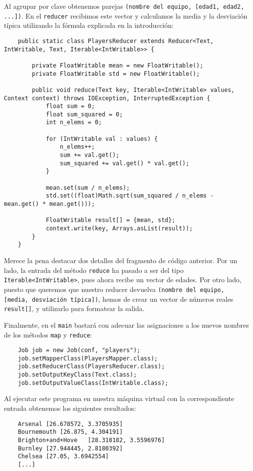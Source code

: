 \documentclass[11pt]{article}
\def\inline{\lstinline[basicstyle=\ttfamily,keywordstyle={}]}
\begin{document}
Al agrupar por clave obtenemos parejas \inline{(nombre del equipo, [edad1, edad2, ...])}. En el \inline{reducer} recibimos este vector y calculamos la media y la desviación típica utilizando la fórmula explicada en la introducción:

\begin{verbatim}
	public static class PlayersReducer extends Reducer<Text, IntWritable, Text, Iterable<IntWritable>> {
		
		private FloatWritable mean = new FloatWritable();
		private FloatWritable std = new FloatWritable();
		
		public void reduce(Text key, Iterable<IntWritable> values, Context context) throws IOException, InterruptedException {
			float sum = 0;
			float sum_squared = 0;
			int n_elems = 0;
			
			for (IntWritable val : values) {
				n_elems++;
				sum += val.get();
				sum_squared += val.get() * val.get();
			}
			
			mean.set(sum / n_elems);
			std.set((float)Math.sqrt(sum_squared / n_elems - mean.get() * mean.get()));
			
			FloatWritable result[] = {mean, std};
			context.write(key, Arrays.asList(result));
		}
	}
\end{verbatim}

Merece la pena destacar dos detalles del fragmento de código anterior. Por un lado, la entrada del método \inline{reduce} ha pasado a ser del tipo \inline{Iterable<IntWritable>}, pues ahora recibe un vector de edades. Por otro lado, puesto que queremos que nuestro reducer devuelva \inline{(nombre del equipo, [media, desviación típica])}, hemos de crear un vector de números reales \inline{result[]}, y utilizarlo para formatear la salida.

Finalmente, en el \inline{main} bastará con adecuar las asignaciones a los nuevos nombres de los métodos \inline{map} y \inline{reduce}:

\begin{verbatim}
	Job job = new Job(conf, "players");
	job.setMapperClass(PlayersMapper.class);
	job.setReducerClass(PlayersReducer.class);
	job.setOutputKeyClass(Text.class);
	job.setOutputValueClass(IntWritable.class);
\end{verbatim}

Al ejecutar este programa en nuestra máquina virtual con la correspondiente entrada obtenemos los siguientes resultados:

\begin{verbatim}
	Arsenal	[26.678572, 3.3705935]
	Bournemouth	[26.875, 4.304191]
	Brighton+and+Hove	[28.318182, 3.5596976]
	Burnley	[27.944445, 2.8180392]
	Chelsea	[27.05, 3.6942554]
	[...]
\end{verbatim}
\end{document}
